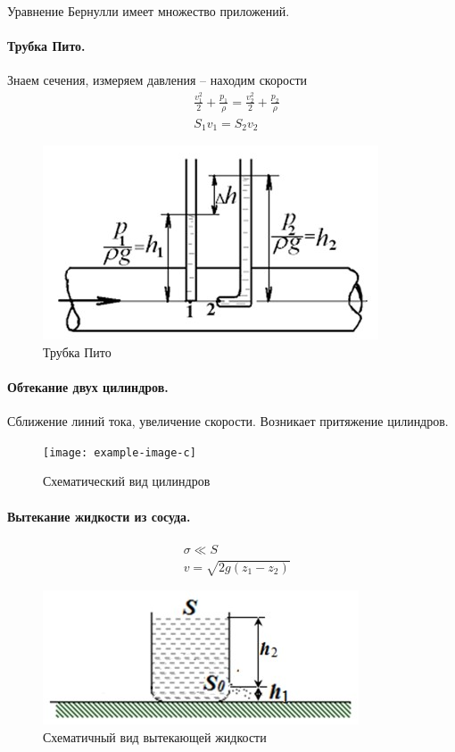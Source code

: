 Уравнение Бернулли имеет множество приложений.
\paragraph{Трубка Пито.}
Знаем сечения, измеряем давления -- находим скорости
\begin{align*}
& \frac { v _ { 1 } ^ { 2 } } { 2 } + \frac { p _ { 1 } } { \rho } = \frac { v _ { 2 } ^ { 2 } } { 2 } + \frac { p _ { 2 } } { \rho } \\
& S _ { 1 } v _ { 1 } = S _ { 2 } v _ { 2 }
\end{align*}
\begin{figure}[H]
	\centering
	\includegraphics[scale=1]{photo/pito.jpg}
	\caption{Трубка Пито}
	\label{fig:figure8}
\end{figure}


\paragraph{Обтекание двух цилиндров.}
Сближение линий тока, увеличение скорости. Возникает притяжение цилиндров.
\begin{figure}[H]
	\centering
	\texttt{[image: example-image-c]}
	\caption{Схематический вид цилиндров}
	\label{fig:figure9}
\end{figure}

\paragraph{Вытекание жидкости из сосуда.}
\begin{align*}
& \sigma \ll S \\
& v = \sqrt { 2 g \left( z _ { 1 } - z _ { 2 } \right) }
\end{align*}
\begin{figure}[H]
	\centering
	\includegraphics[scale=1]{photo/vutekanie.jpg}
	\caption{Схематичный вид вытекающей жидкости}
	\label{fig:figure10}
\end{figure}

